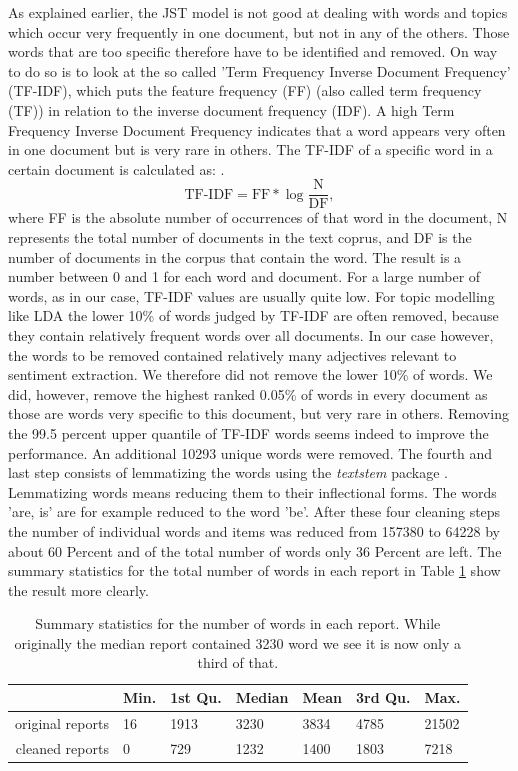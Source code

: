 As explained earlier, the JST model is not good at dealing with words and topics which occur very frequently in one document, but not in any of the others. Those words that are too specific therefore have to be identified and removed. On way to do so is to look at the so called 'Term Frequency Inverse Document Frequency' (TF-IDF), which puts the feature frequency (FF) (also called term frequency (TF)) in relation to the inverse document frequency (IDF).
A high Term Frequency Inverse Document Frequency indicates that a word appears very often in one document but is very rare in others. The TF-IDF of a specific word in a certain document is calculated as:
\citep{na2004effectiveness}. 
\begin{equation}
    \text{TF-IDF} = \text{FF} * \log{\frac{\text{N}}{\text{DF}},}
\end{equation} 
where FF is the absolute number of occurrences of that word in the document, N represents the total number of documents in the text coprus, and DF is the number of documents in the corpus that contain the word. The result is a number between 0 and 1 for each word and document. For a large number of words, as in our case, TF-IDF values are usually quite low. For topic modelling like LDA the lower 10\% of words judged by TF-IDF are often removed, because they contain relatively frequent words over all documents. In our case however, the words to be removed contained relatively many adjectives relevant to sentiment extraction. We therefore did not remove the lower 10\% of words. We did, however, remove the highest ranked 0.05\% of words in every document as those are words very specific to this document, but very rare in others. Removing the 99.5 percent upper quantile of TF-IDF words seems indeed to improve the performance. An additional 10293 unique words were removed. The fourth and last step consists of lemmatizing the words using the \textit{textstem} package \citep{textstem}. Lemmatizing words means reducing them to their inflectional forms. The words 'are, is' are for example reduced to the word 'be'. After these four cleaning steps the number of individual words and items was reduced from 157380 to 64228 by about 60 Percent and of the total number of words only 36 Percent are left. The summary statistics for the total number of words in each report in Table \ref{tab:summaryCR} show the result more clearly. 
\begin{table}[ht]
\centering
\begin{tabular}{rllllll}
  \hline
  & Min. & 1st Qu. & Median  &  Mean & 3rd Qu. &   Max. \\
  \hline
  original reports & 16  &  1913  &  3230 &   3834  &  4785  & 21502  \\ 
  cleaned reports  & 0   &  729  &  1232  &  1400  &  1803  &  7218  \\ 
   \hline
\end{tabular}
\caption{Summary statistics for the number of words in each report. While originally the median report contained 3230 word we see it is now only a third of that.}
\label{tab:summaryCR}
\end{table}

